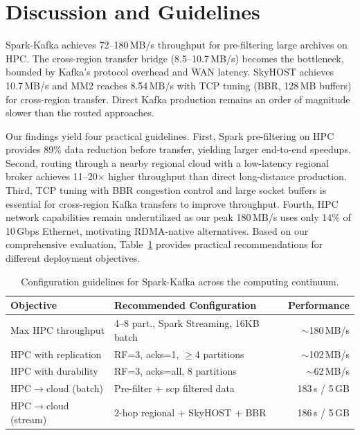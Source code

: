 \documentclass[runningheads]{llncs}
\begin{document}
\section{Discussion and Guidelines}
\label{sec:discussion}

Spark-Kafka achieves 72--180\,MB/s throughput for pre-filtering large archives on HPC. The cross-region transfer bridge (8.5--10.7\,MB/s) becomes the bottleneck, bounded by Kafka's protocol overhead and WAN latency. SkyHOST achieves 10.7\,MB/s and MM2 reaches 8.54\,MB/s with TCP tuning (BBR, 128\,MB buffers) for cross-region transfer. Direct Kafka production remains an order of magnitude slower than the routed approaches.

Our findings yield four practical guidelines. First, Spark pre-filtering on HPC provides 89\% data reduction before transfer, yielding larger end-to-end speedups. Second, routing through a nearby regional cloud with a low-latency regional broker achieves 11--20$\times$ higher throughput than direct long-distance production. Third, TCP tuning with BBR congestion control and large socket buffers is essential for cross-region Kafka transfers to improve throughput. Fourth, HPC network capabilities remain underutilized as our peak 180\,MB/s uses only 14\% of 10\,Gbps Ethernet, motivating RDMA-native alternatives. Based on our comprehensive evaluation, Table~\ref{tab:guidelines} provides practical recommendations for different deployment objectives.

\begin{table}[t]
\centering
\caption{Configuration guidelines for Spark-Kafka across the computing continuum.}
\label{tab:guidelines}
\small
\begin{tabular}{@{}p{3.8cm}p{5.8cm}r@{}}
\toprule
\textbf{Objective} & \textbf{Recommended Configuration} & \textbf{Performance} \\
\midrule
Max HPC throughput & 4--8 part., Spark Streaming, 16KB batch & $\sim$180\,MB/s \\
HPC with replication & RF=3, acks=1, $\geq$4 partitions & $\sim$102\,MB/s \\
HPC with durability & RF=3, acks=all, 8 partitions & $\sim$62\,MB/s \\
HPC$\to$cloud (batch) & Pre-filter + scp filtered data & 183\,s / 5\,GB \\
HPC$\to$cloud (stream) & 2-hop regional + SkyHOST + BBR & 186\,s / 5\,GB \\
\bottomrule
\end{tabular}
\end{table}
\end{document}
